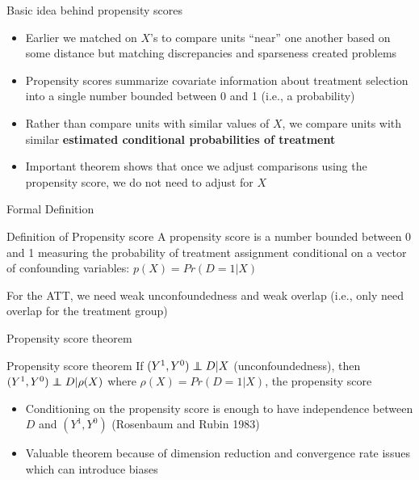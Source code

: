\documentclass{beamer}
\newcommand\independent{\protect\mathpalette{\protect\independenT}{\perp}}
\def\independenT#1#2{\mathrel{\rlap{$#1#2$}\mkern2mu{#1#2}}}
\begin{document}
\begin{frame}{Basic idea behind propensity scores}
	
	\begin{itemize}
	\item Earlier we matched on $X$'s to compare units ``near'' one another based on some distance but matching discrepancies and sparseness created problems
	\item Propensity scores summarize covariate information about treatment selection into a single number bounded between 0 and 1 (i.e., a probability)
	\item Rather than compare units with similar values of $X$, we compare units with similar \textbf{estimated conditional probabilities of treatment}
	\item Important theorem shows that once we adjust comparisons using the propensity score, we do not need to adjust for $X$
	\end{itemize}
\end{frame}



\begin{frame}{Formal Definition}
	
	\begin{block}{Definition of Propensity score}
	A propensity score is a number bounded between 0 and 1 measuring the probability of treatment assignment conditional on a vector of confounding variables: $p(X)=Pr(D=1 | X)$
	\end{block}
	
	\bigskip
	
	For the ATT, we need weak unconfoundedness and weak overlap (i.e., only need overlap for the treatment group)

\end{frame}

\begin{frame}{Propensity score theorem}
	
	\begin{block}{Propensity score theorem}
	If $(Y^1,Y^0)\independent{D}|X$ (unconfoundedness), then $(Y^1,Y^0)\independent{D} | \rho(X)$ where $\rho(X)=Pr(D=1|X)$, the propensity score
	\end{block}
	
	\begin{itemize}
	\item Conditioning on the propensity score is enough to have independence between $D$ and $(Y^1,Y^0)$ (Rosenbaum and Rubin 1983)
	 \item Valuable theorem because of dimension reduction and convergence rate issues which can introduce biases
	\end{itemize}
\end{frame}
\end{document}
